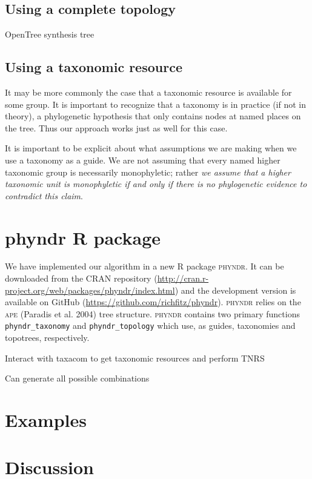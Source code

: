 \documentclass[a4paper,11pt]{article}
\begin{document}
\subsection{Using a complete topology}

OpenTree synthesis tree

\subsection{Using a taxonomic resource}

It may be more commonly the case that a taxonomic resource is available for some group. It is important to recognize that a taxonomy is in practice (if not in theory), a phylogenetic hypothesis that only contains nodes at named places on the tree. Thus our approach works just as well for this case.

It is important to be explicit about what assumptions we are making when we use a taxonomy as a guide. We are not assuming that every named higher taxonomic group is necessarily monophyletic; rather \emph{we assume that a higher taxonomic unit is monophyletic if and only if there is no phylogenetic evidence to contradict this claim}.  

\section{phyndr R package}

We have implemented our algorithm in a new R package \textsc{phyndr}. It can be downloaded from the CRAN repository (\url{http://cran.r-project.org/web/packages/phyndr/index.html}) and the development version is available on GitHub (\url{https://github.com/richfitz/phyndr}). \textsc{phyndr} relies on the \textsc{ape} (Paradis et al. 2004) tree structure. \textsc{phyndr} contains two primary functions \texttt{phyndr\_taxonomy} and \texttt{phyndr\_topology} which use, as guides, taxonomies and topotrees, respectively. 

Interact with taxacom to get taxonomic resources and perform TNRS

Can generate all possible combinations

\section{Examples}

\section{Discussion}
\end{document}
